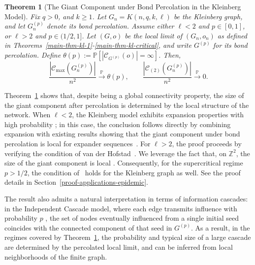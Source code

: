 \documentclass[10pt]{amsart}
\newtheorem{theorem}{Theorem}[section]
\begin{document}
\begin{theorem}[The Giant Component under Bond Percolation in the Kleinberg Model]
\label{thm:kleinberg-perc-giant}
Fix $q > 0$, and $k\ge 1$. Let $G_n = K(n,q,k,\ell)$ be the Kleinberg graph, and let $G_n^{(p)}$ denote its bond percolation. Assume either $\ell < 2$ and $p\in[0,1]$, or $\ell>2$ and $p\in(1/2,1]$. Let $(G,o)$ be the local limit of $(G_n,o_n)$ as defined in Theorems~\ref{main-thm-kl-1}-\ref{main-thm-kl-critical}, and write $G^{(p)}$ for its bond percolation. Define $\theta(p) := \mathbb P\!\left[|\mathcal C_{G^{(p)}}(o)|=\infty\right]$. Then,
\[
\frac{|\mathcal C_{\max}(G_n^{(p)})|}{n^2} \xrightarrow{\mathbb P} \theta(p),
\qquad
\frac{|\mathcal C_{(2)}(G_n^{(p)})|}{n^2} \xrightarrow{\mathbb P} 0 .
\]
\end{theorem}

Theorem~\ref{thm:kleinberg-perc-giant} shows that, despite being a global connectivity property, the size of the giant component after percolation is determined by the local structure of the network.  When $\ell < 2$, the Kleinberg model exhibits expansion properties with high probability \cite{flaxman}; in this case, the conclusion follows directly by combining expansion with existing results showing that the giant component under bond percolation is local for expander sequences~\cite{yeganeh-digraph}. For $\ell>2$, the proof proceeds by verifying the condition of van der Hofstad~\cite{vanderhofstad2023giant}. We leverage the fact that, on $\mathbb Z^2$, the size of the giant component is local \cite{borgs2000lattice}.  Consequently, for the supercritical regime $p>1/2$, the condition of~\cite{vanderhofstad2023giant} holds for the Kleinberg graph as well. See the proof details in Section~\ref{proof-applications-epidemic}. 

The result also admits a natural interpretation in terms of information cascades: in the Independent Cascade model, where each edge transmits influence with probability $p$ \cite{borgs2014soda, chen2009kdd, kempe2003kdd}, the set of nodes eventually influenced from a single initial seed coincides with the connected component of that seed in $G^{(p)}$. As a result, in the regimes covered by Theorem~\ref{thm:kleinberg-perc-giant}, the probability and typical size of a large cascade are determined by the percolated local limit, and can be inferred from local neighborhoods of the finite graph.

\end{document}
